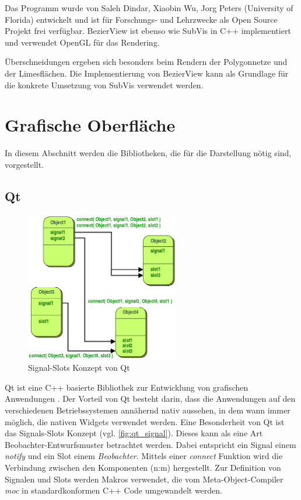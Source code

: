 Das Programm wurde von Saleh Dindar, Xiaobin Wu, Jorg Peters (University of Florida) entwickelt und ist für Forschungs- und Lehrzwecke als Open Source Projekt frei verfügbar. BezierView ist ebenso wie SubVis in C++ implementiert und verwendet OpenGL für das Rendering.

Überschneidungen ergeben sich besonders beim Rendern der Polygonnetze und der Limesflächen. Die Implementierung von BezierView kann als Grundlage für die konkrete Umsetzung von SubVis verwendet werden.


\section{Grafische Oberfläche}

In diesem Abschnitt werden die Bibliotheken, die für die Darstellung nötig sind, vorgestellt.

\subsection{Qt} 

\begin{figure}[hp]
  \centering
  \includegraphics[width=0.6\textwidth]{content/media/qt_signal}
  \caption{Signal-Slots Konzept von Qt \cite{Qt}}
  \label{fig:qt_signal}
\end{figure}

Qt ist eine C++ basierte Bibliothek zur Entwicklung von grafischen Anwendungen \cite{Qt}. 
Der Vorteil von Qt besteht darin, dass die Anwendungen auf den verschiedenen Betriebssystemen annähernd nativ aussehen, in dem wann immer möglich, die nativen Widgets verwendet werden.
Eine Besonderheit von Qt ist das Signals-Slots Konzept (vgl. \autoref{fig:qt_signal}). 
Dieses kann als eine Art Beobachter-Entwurfsmuster betrachtet werden.
Dabei entspricht ein Signal einem \emph{notify} und ein Slot einem \emph{Beobachter}. 
Mittels einer \emph{connect} Funktion wird die Verbindung zwischen den Komponenten (n:m) hergestellt.
Zur Definition von Signalen und Slots werden Makros verwendet, die vom Meta-Object-Compiler \emph{moc} in standardkonformen C++ Code umgewandelt werden.

